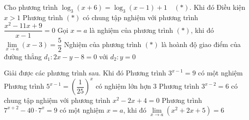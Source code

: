 \begin{ex}%
 Cho  phương trình $\log_3(x+6)=\log_3(x-1)+1 \quad (*)$. Khi đó
 \choiceTF 
  {\True  Điều kiện $x>1$}
  {\True Phương trình $(*)$ có chung tập nghiệm với phương trình $\dfrac{x^2-11x+9}{x-1}=0$} 
  { Gọi $x=a$ là nghiệm của phương trình $(*)$, khi  đó $\lim\limits_{x \to a}(x-3)=\dfrac{5}{2}$}
  {Nghiệm của phương trình $(*)$ là hoành độ giao điểm của đường thẳng $d_1 \colon  2x-y-8=0$ với $d_2 \colon y=0$}
\end{ex}

\begin{ex}%
 Giải được các phương trình sau. Khi  đó
  \choiceTF
  {\True Phương trình $3^{x-1}=9$ có một nghiệm} 
   {Phương trình $5^{x-1}=\left(\dfrac{1}{25}\right)^x$ có nghiệm lớn hợn $3$}
  {Phương trình $3^{x-2}=6$  có chung tập nghiệm với phương trình $x^2-2 x+4=0$}
  {Phương trình $7^{x+2}-40\cdot 7^x=9$ có một nghiệm $x=a$, khi đó $\lim\limits _{x \rightarrow  a}\left(x^2+2 x+5\right)=6$}
\end{ex}

